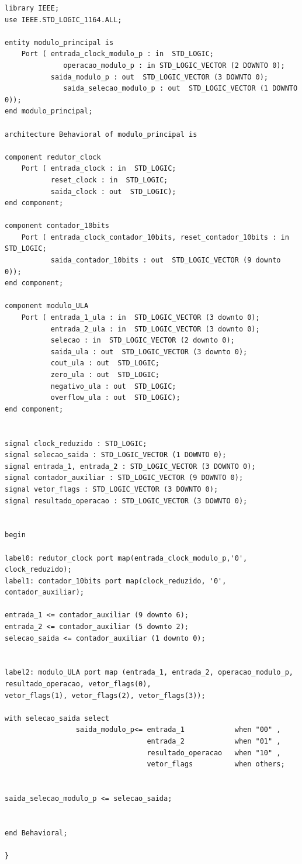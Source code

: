 \documentclass[a4paper,12pt,twoside]{article}
\begin{document}
\begin{lstlisting}
library IEEE;
use IEEE.STD_LOGIC_1164.ALL;

entity modulo_principal is
    Port ( entrada_clock_modulo_p : in  STD_LOGIC;
			  operacao_modulo_p : in STD_LOGIC_VECTOR (2 DOWNTO 0);
           saida_modulo_p : out  STD_LOGIC_VECTOR (3 DOWNTO 0);
			  saida_selecao_modulo_p : out  STD_LOGIC_VECTOR (1 DOWNTO 0));
end modulo_principal;

architecture Behavioral of modulo_principal is

component redutor_clock
    Port ( entrada_clock : in  STD_LOGIC;
           reset_clock : in  STD_LOGIC;
           saida_clock : out  STD_LOGIC);
end component;

component contador_10bits
    Port ( entrada_clock_contador_10bits, reset_contador_10bits : in  STD_LOGIC;
           saida_contador_10bits : out  STD_LOGIC_VECTOR (9 downto 0));
end component;

component modulo_ULA 
    Port ( entrada_1_ula : in  STD_LOGIC_VECTOR (3 downto 0);
           entrada_2_ula : in  STD_LOGIC_VECTOR (3 downto 0);
           selecao : in  STD_LOGIC_VECTOR (2 downto 0);
           saida_ula : out  STD_LOGIC_VECTOR (3 downto 0);
           cout_ula : out  STD_LOGIC;
           zero_ula : out  STD_LOGIC;
           negativo_ula : out  STD_LOGIC;
           overflow_ula : out  STD_LOGIC);
end component;


signal clock_reduzido : STD_LOGIC;
signal selecao_saida : STD_LOGIC_VECTOR (1 DOWNTO 0);
signal entrada_1, entrada_2 : STD_LOGIC_VECTOR (3 DOWNTO 0);
signal contador_auxiliar : STD_LOGIC_VECTOR (9 DOWNTO 0);
signal vetor_flags : STD_LOGIC_VECTOR (3 DOWNTO 0);
signal resultado_operacao : STD_LOGIC_VECTOR (3 DOWNTO 0);


begin

label0: redutor_clock port map(entrada_clock_modulo_p,'0', clock_reduzido);
label1: contador_10bits port map(clock_reduzido, '0', contador_auxiliar);

entrada_1 <= contador_auxiliar (9 downto 6);
entrada_2 <= contador_auxiliar (5 downto 2);
selecao_saida <= contador_auxiliar (1 downto 0);


label2: modulo_ULA port map (entrada_1, entrada_2, operacao_modulo_p, resultado_operacao, vetor_flags(0),
vetor_flags(1), vetor_flags(2), vetor_flags(3));

with selecao_saida select
                 saida_modulo_p<= entrada_1            when "00" ,
                                  entrada_2            when "01" ,
                                  resultado_operacao   when "10" ,
                                  vetor_flags          when others;
										

saida_selecao_modulo_p <= selecao_saida;


end Behavioral;

} \end{lstlisting}
\end{document}
